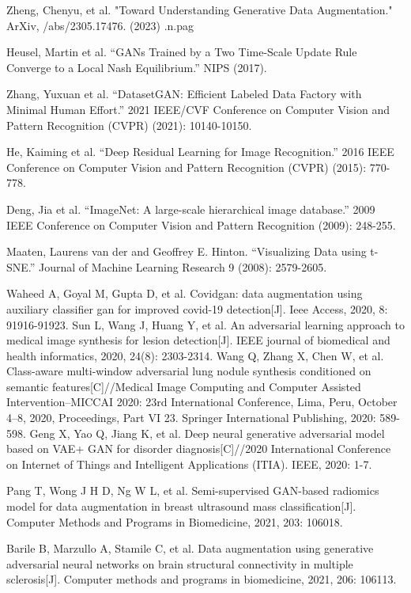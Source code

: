 \documentclass[preprint,12pt,authoryear]{elsarticle}
\begin{document}
\begin{thebibliography}{00}
Zheng, Chenyu, et al. "Toward Understanding Generative Data Augmentation." ArXiv, /abs/2305.17476. (2023) .n.pag

Heusel, Martin et al. “GANs Trained by a Two Time-Scale Update Rule Converge to a Local Nash Equilibrium.” NIPS (2017).

Zhang, Yuxuan et al. “DatasetGAN: Efficient Labeled Data Factory with Minimal Human Effort.” 2021 IEEE/CVF Conference on Computer Vision and Pattern Recognition (CVPR) (2021): 10140-10150.

He, Kaiming et al. “Deep Residual Learning for Image Recognition.” 2016 IEEE Conference on Computer Vision and Pattern Recognition (CVPR) (2015): 770-778.

Deng, Jia et al. “ImageNet: A large-scale hierarchical image database.” 2009 IEEE Conference on Computer Vision and Pattern Recognition (2009): 248-255.

Maaten, Laurens van der and Geoffrey E. Hinton. “Visualizing Data using t-SNE.” Journal of Machine Learning Research 9 (2008): 2579-2605.

Waheed A, Goyal M, Gupta D, et al. Covidgan: data augmentation using auxiliary classifier gan for improved covid-19 detection[J]. Ieee Access, 2020, 8: 91916-91923.
Sun L, Wang J, Huang Y, et al. An adversarial learning approach to medical image synthesis for lesion detection[J]. IEEE journal of biomedical and health informatics, 2020, 24(8): 2303-2314.
Wang Q, Zhang X, Chen W, et al. Class-aware multi-window adversarial lung nodule synthesis conditioned on semantic features[C]//Medical Image Computing and Computer Assisted Intervention–MICCAI 2020: 23rd International Conference, Lima, Peru, October 4–8, 2020, Proceedings, Part VI 23. Springer International Publishing, 2020: 589-598.
Geng X, Yao Q, Jiang K, et al. Deep neural generative adversarial model based on VAE+ GAN for disorder diagnosis[C]//2020 International Conference on Internet of Things and Intelligent Applications (ITIA). IEEE, 2020: 1-7.

Pang T, Wong J H D, Ng W L, et al. Semi-supervised GAN-based radiomics model for data augmentation in breast ultrasound mass classification[J]. Computer Methods and Programs in Biomedicine, 2021, 203: 106018.

Barile B, Marzullo A, Stamile C, et al. Data augmentation using generative adversarial neural networks on brain structural connectivity in multiple sclerosis[J]. Computer methods and programs in biomedicine, 2021, 206: 106113.


\end{thebibliography}
\end{document}
